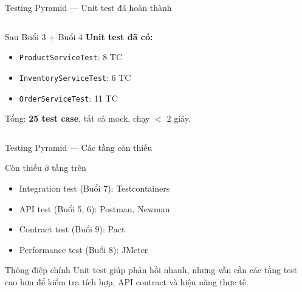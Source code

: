 \documentclass[aspectratio=169,10pt]{beamer}
\begin{document}
\begin{frame}{Testing Pyramid --- Unit test đã hoàn thành}
  \begin{columns}
    \begin{block}{Sau Buổi 3 + Buổi 4}
      \textbf{Unit test đã có:}
      \begin{itemize}
        \item \texttt{ProductServiceTest}: 8 TC
        \item \texttt{InventoryServiceTest}: 6 TC
        \item \texttt{OrderServiceTest}: 11 TC
      \end{itemize}
      Tổng: \textbf{25 test case}, tất cả mock, chạy $<$ 2 giây.
    \end{block}

    \begin{center}
    \end{center}
  \end{columns}
\end{frame}

\begin{frame}{Testing Pyramid --- Các tầng còn thiếu}
  \begin{block}{Còn thiếu ở tầng trên}
    \begin{itemize}
      \item Integration test (Buổi 7): Testcontainers
      \item API test (Buổi 5, 6): Postman, Newman
      \item Contract test (Buổi 9): Pact
      \item Performance test (Buổi 8): JMeter
    \end{itemize}
  \end{block}

  \begin{alertblock}{Thông điệp chính}
    Unit test giúp phản hồi nhanh, nhưng vẫn cần các tầng test cao hơn
    để kiểm tra tích hợp, API contract và hiệu năng thực tế.
  \end{alertblock}
\end{frame}
\end{document}
